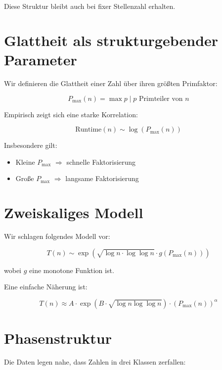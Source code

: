 \documentclass[11pt,a4paper]{article}
\begin{document}
	Diese Struktur bleibt auch bei fixer Stellenzahl erhalten.
	
	\section{Glattheit als strukturgebender Parameter}
	
	Wir definieren die Glattheit einer Zahl über ihren größten Primfaktor:
	
	\begin{equation}
		P_{\max}(n) = \max { p \mid p \text{ Primteiler von } n }
	\end{equation}
	
	Empirisch zeigt sich eine starke Korrelation:
	
	\begin{equation}
		\text{Runtime}(n) \sim \log(P_{\max}(n))
	\end{equation}
	
	Insbesondere gilt:
	
	\begin{itemize}
		\item Kleine $P_{\max}$ $\Rightarrow$ schnelle Faktorisierung
		\item Große $P_{\max}$ $\Rightarrow$ langsame Faktorisierung
	\end{itemize}
	
	\section{Zweiskaliges Modell}
	
	Wir schlagen folgendes Modell vor:
	
	\begin{equation}
		T(n) \sim \exp\left(
		\sqrt{\log n \cdot \log\log n}
		\cdot g(P_{\max}(n))
		\right)
	\end{equation}
	
	wobei $g$ eine monotone Funktion ist.
	
	Eine einfache Näherung ist:
	
	\begin{equation}
		T(n) \approx A \cdot \exp(B \cdot \sqrt{\log n \log\log n}) \cdot (P_{\max}(n))^\alpha
	\end{equation}
	
	\section{Phasenstruktur}
	
	Die Daten legen nahe, dass Zahlen in drei Klassen zerfallen:
	
\end{document}
